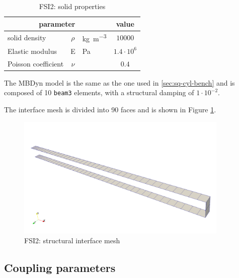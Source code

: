 \begin{table}[!htb]
	\begin{center}
		\begin{tabular}{ l c  l | c } 
			\multicolumn{3}{c|}{parameter} & value    \\ 
			\hline
			solid density  & $\rho$ & \si{kg.m^{-3}} & $10000$    \\
			Elastic modulus  & E & \si{Pa} & $1.4\cdot 10^6$    \\
			Poisson coefficient & $\nu$ & & $0.4$  \\
		\end{tabular}
	\end{center}
	\caption{FSI2: solid properties}
	\label{table:FSI2-solid}
\end{table}

The MBDyn model is the same as the one used in \ref{sec:sq-cyl-bench} and is composed of 10 \texttt{beam3} elements, with a structural damping of $1\cdot10^{-2}$.

The interface mesh is divided into 90 faces and is shown in Figure \ref{fig:FSI2_struct_mesh}. 

\begin{figure}[htbp!]
	\centering
	\includegraphics[width=0.9\textwidth, trim=0 50 0 150, clip]{images/FSI2/fsi2_struct_mesh.png}
	\caption{FSI2: structural interface mesh}
	\label{fig:FSI2_struct_mesh}
\end{figure}


\subsection{Coupling parameters}


